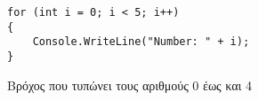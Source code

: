 \begin{listing}[htbp]
\begin{verbatim}
for (int i = 0; i < 5; i++)
{
    Console.WriteLine("Number: " + i);
}
\end{verbatim}
\caption{Βρόχος που τυπώνει τους αριθμούς 0 έως και 4}
\label{flagExec}
\end{listing}